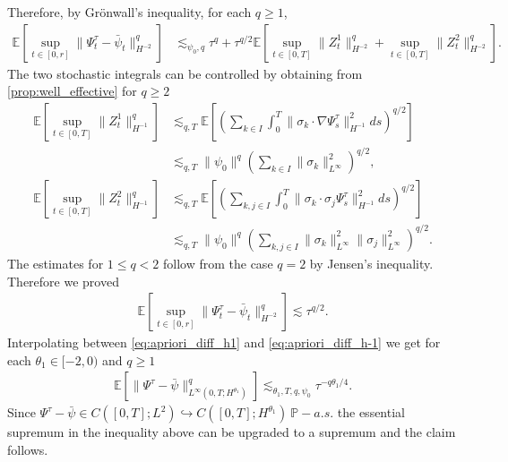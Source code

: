 \documentclass[a4paper,10pt]{amsart}
\newcommand{\expt}[1]{\mathbb{E}\left[#1\right]}
\theoremstyle{remark}
\numberwithin{equation}{section}
\begin{document}
Therefore, by Gr\"onwall's inequality, for each $q\geq1$,
\begin{align*}
    \expt{\sup_{t\in [0,r]}\|\Psi^{\tau}_t-\bar{\psi}_t \|_{H^{-2}}^q}
    &\lesssim_{\psi_0,q}\tau^q
    +\tau^{q/2}\expt{\sup_{t\in [0,T]}\|Z^1_t\|_{H^{-2}}^q+\sup_{t\in [0,T]}\|Z^2_t\|_{H^{-2}}^q}.
\end{align*}
The two stochastic integrals can be controlled by \cite[Theorem 1, Remark 2]{tubaro1984estimate} obtaining from \cref{prop:well_effective} for $q\geq 2$
\begin{align*}
    \expt{\sup_{t\in [0,T]}\|Z^1_t\|_{H^{-1}}^q}&\lesssim_{q,T} \expt{\left(\sum_{k\in I}\int_0^T\|\sigma_k\cdot\nabla\Psi^{\tau}_s\|_{H^{-1}}^2 ds\right)^{q/2}}\\ & \lesssim_{q,T}  \|\psi_0\|^q\left(\sum_{k\in I}\|\sigma_k\|_{L^{\infty}}^2 \right)^{q/2},\\
     \expt{\sup_{t\in [0,T]}\|Z^2_t\|_{H^{-1}}^q}&\lesssim_{q,T} \expt{\left(\sum_{k,j\in I}\int_0^T\|\sigma_k\cdot\sigma_j \Psi^{\tau}_s\|_{H^{-1}}^2 ds\right)^{q/2}}\\
     &\lesssim_{q,T} \|\psi_0\|^q\left(\sum_{k,j\in I}\|\sigma_k\|_{L^{\infty}}^2\|\sigma_j\|_{L^{\infty}}^2 \right)^{q/2}.
\end{align*}
The estimates for $1\leq q<2$ follow from the case $q=2$ by Jensen's
inequality.
Therefore we proved
\begin{align}\label{eq:apriori_diff_h-1}
	     \expt{\sup_{t\in [0,r]}
	     \|\Psi^{\tau}_t-\bar{\psi}_t \|_{H^{-2}}^q}
	     \lesssim \tau^{q/2}.
\end{align}
Interpolating between \eqref{eq:apriori_diff_h1} and \eqref{eq:apriori_diff_h-1} we get for each $\theta_1\in [-2,0)$ and $q\geq 1$
\begin{align*}
   \expt{\|\Psi^{\tau}-\bar{\psi} \|_{L^\infty(0,T;H^{\theta_1})}^q}\lesssim_{\theta_1,T,q,\psi_0} \tau^{-q\theta_1 /4}.
\end{align*}
Since $\Psi^{\tau}-\bar{\psi}\in C([0,T];L^2)\hookrightarrow C([0,T];H^{\theta_1})\ \mathbb{P}-a.s.$ the essential supremum in the inequality above can be upgraded to a supremum and the claim follows.
\end{document}
